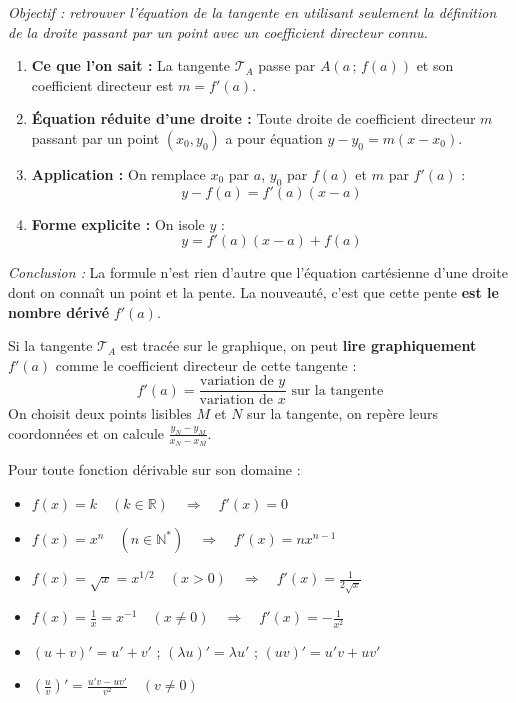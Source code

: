 \documentclass[11pt]{article}
\begin{document}
\begin{experience}
\emph{Objectif : retrouver l'équation de la tangente en utilisant seulement la définition de la droite passant par un point avec un coefficient directeur connu.}

\begin{enumerate}
  \item \textbf{Ce que l'on sait :} La tangente $\mathcal{T}_A$ passe par $A(a\,;\,f(a))$ et son coefficient directeur est $m = f'(a)$.
  \item \textbf{Équation réduite d'une droite :} Toute droite de coefficient directeur $m$ passant par un point $(x_0,y_0)$ a pour équation $y - y_0 = m(x - x_0)$.
  \item \textbf{Application :} On remplace $x_0$ par $a$, $y_0$ par $f(a)$ et $m$ par $f'(a)$ :
        \[ y - f(a) = f'(a)(x - a) \]
  \item \textbf{Forme explicite :} On isole $y$ :
        \[ y = f'(a)(x - a) + f(a) \]
\end{enumerate}
\emph{Conclusion :} La formule n'est rien d'autre que l'équation cartésienne d'une droite dont on connaît un point et la pente. La nouveauté, c'est que cette pente \textbf{est le nombre dérivé} $f'(a)$.
\end{experience}

\begin{aretenir}
Si la tangente $\mathcal{T}_A$ est tracée sur le graphique, on peut \textbf{lire graphiquement} $f'(a)$ comme le coefficient directeur de cette tangente :
\[
f'(a) = \frac{\text{variation de } y}{\text{variation de } x} \text{ sur la tangente}
\]
On choisit deux points lisibles $M$ et $N$ sur la tangente, on repère leurs coordonnées et on calcule $\frac{y_N - y_M}{x_N - x_M}$.
\end{aretenir}

\begin{aretenir}
Pour toute fonction dérivable sur son domaine :
\begin{itemize}
  \item $f(x) = k \quad (k \in \mathbb{R}) \quad \Rightarrow \quad f'(x) = 0$
  \item $f(x) = x^n \quad (n \in \mathbb{N}^*) \quad \Rightarrow \quad f'(x) = n x^{n-1}$
  \item $f(x) = \sqrt{x} = x^{1/2} \quad (x > 0) \quad \Rightarrow \quad f'(x) = \frac{1}{2\sqrt{x}}$
  \item $f(x) = \frac{1}{x} = x^{-1} \quad (x \neq 0) \quad \Rightarrow \quad f'(x) = -\frac{1}{x^2}$
  \item $(u+v)' = u' + v'$ \quad ; \quad $(\lambda u)' = \lambda u'$ \quad ; \quad $(uv)' = u'v + uv'$
  \item $\left(\frac{u}{v}\right)' = \frac{u'v - uv'}{v^2} \quad (v \neq 0)$
\end{itemize}
\end{aretenir}
\end{document}
